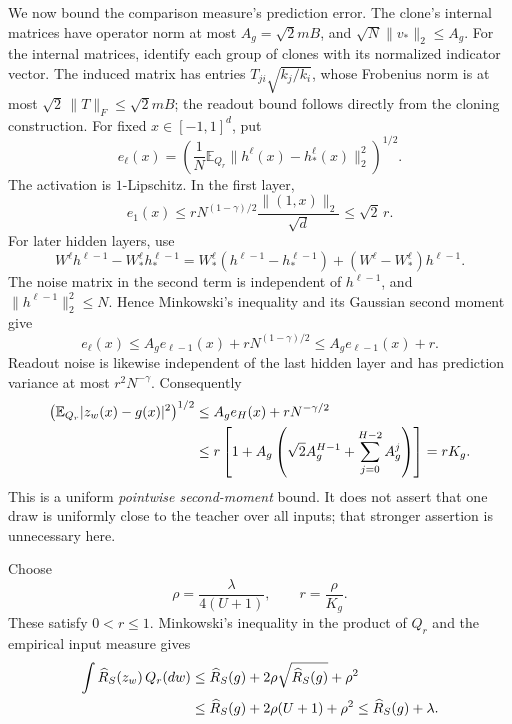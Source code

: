 We now bound the comparison measure's prediction error.  The clone's
internal matrices have operator norm at most $A_g=\sqrt2mB$, and
$\sqrt N\|v_*\|_2\leq A_g$.  For the internal matrices, identify each
group of clones with its normalized indicator vector.  The induced
matrix has entries $T_{ji}\sqrt{k_j/k_i}$, whose Frobenius norm is at
most $\sqrt2\,\|T\|_F\leq\sqrt2mB$; the readout bound follows directly
from the cloning construction.
For fixed $x\in[-1,1]^d$, put
\[
 e_\ell(x)
   =\left(\frac1N\mathbb E_{Q_r}
        \|h^\ell(x)-h_*^\ell(x)\|_2^2\right)^{1/2}.
\]
The activation is $1$-Lipschitz.  In the first layer,
\begin{equation}
 e_1(x)
  \leq rN^{(1-\gamma)/2}\frac{\|(1,x)\|_2}{\sqrt d}
  \leq\sqrt2\,r.
 \label{eq:finite-first-perturbation}
\end{equation}
For later hidden layers, use
\[
 W^\ell h^{\ell-1}-W_*^\ell h_*^{\ell-1}
   =W_*^\ell(h^{\ell-1}-h_*^{\ell-1})
                   +(W^\ell-W_*^\ell)h^{\ell-1}.
\]
The noise matrix in the second term is independent of
$h^{\ell-1}$, and $\|h^{\ell-1}\|_2^2\leq N$.  Hence Minkowski's
inequality and its Gaussian second moment give
\begin{equation}
 e_\ell(x)
   \leq A_g e_{\ell-1}(x)+rN^{(1-\gamma)/2}
   \leq A_g e_{\ell-1}(x)+r.
 \label{eq:finite-hidden-perturbation}
\end{equation}
Readout noise is likewise independent of the last hidden layer and
has prediction variance at most $r^2N^{-\gamma}$.  Consequently
\begin{align}
 \left(\mathbb E_{Q_r}|z_w(x)-g(x)|^2\right)^{1/2}
 &\leq A_g e_H(x)+rN^{-\gamma/2}\notag\\
 &\leq r\left[1+A_g\left(\sqrt2 A_g^{H-1}
                       +\sum_{j=0}^{H-2}A_g^j\right)\right]
   =rK_g.
 \label{eq:finite-output-perturbation}
\end{align}
This is a uniform \emph{pointwise second-moment} bound.  It does not
assert that one draw is uniformly close to the teacher over all inputs;
that stronger assertion is unnecessary here.

Choose
\begin{equation}
 \rho=\frac\lambda{4(U+1)},\qquad r=\frac\rho{K_g}.
 \label{eq:finite-comparison-radius}
\end{equation}
These satisfy $0<r\leq1$.  Minkowski's inequality in the product of
$Q_r$ and the empirical input measure gives
\begin{align}
 \int\widehat R_S(z_w)\,Q_r(dw)
 &\leq\widehat R_S(g)+2\rho\sqrt{\widehat R_S(g)}+\rho^2
 \notag\\
 &\leq\widehat R_S(g)+2\rho(U+1)+\rho^2
 \leq\widehat R_S(g)+\lambda.
 \label{eq:finite-comparison-risk}
\end{align}

